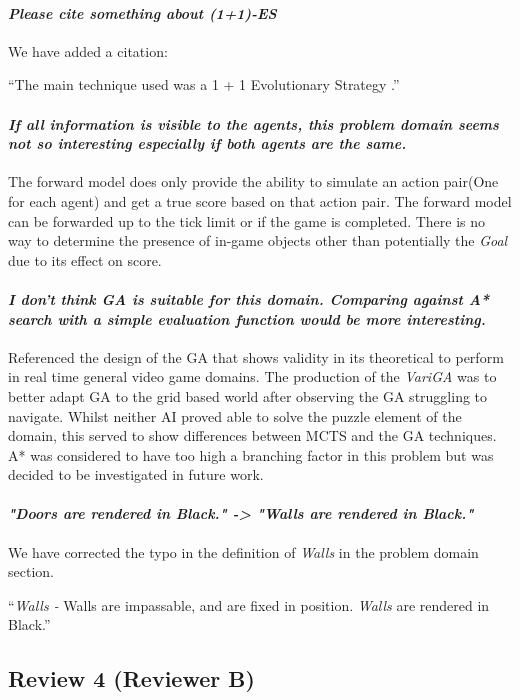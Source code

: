 \documentclass{article}
\begin{document}
\paragraph*{\textit{Please cite something about (1+1)-ES}}
We have added a citation:

``The main technique used was a 1 + 1 Evolutionary Strategy \cite{t.back2000evolutionary-co}.''

\paragraph*{\textit{If all information is visible to the agents,
this problem domain seems not so interesting especially if
both agents are the same.}}
The forward model does only provide the ability to simulate an action pair(One for each agent) and get a true score based on that action pair. The forward model can be forwarded up to the tick limit or if the game is completed. There is no way to determine the presence of in-game objects other than potentially the \emph{Goal} due to its effect on score.
\paragraph*{\textit{I don't think GA is suitable for this domain.
Comparing against A* search with a simple evaluation function would be more interesting.}}
Referenced the design of the GA that shows validity in its theoretical to perform in real time general video game domains. The production of the \emph{VariGA} was to better adapt GA to the grid based world after observing the GA struggling to navigate. Whilst neither AI proved able to solve the puzzle element of the domain, this served to show differences between MCTS and the GA techniques. A* was considered to have too high a branching factor in this problem but was decided to be investigated in future work.

\paragraph*{\textit{"Doors are rendered in Black." -> "Walls are rendered in Black."}}
We have corrected the typo in the definition of \emph{Walls} in the problem domain section.

``\emph{Walls -} Walls are impassable, and are fixed in position. \emph{Walls} are rendered in Black.''
\subsection{Review 4 (Reviewer B)}
\end{document}
